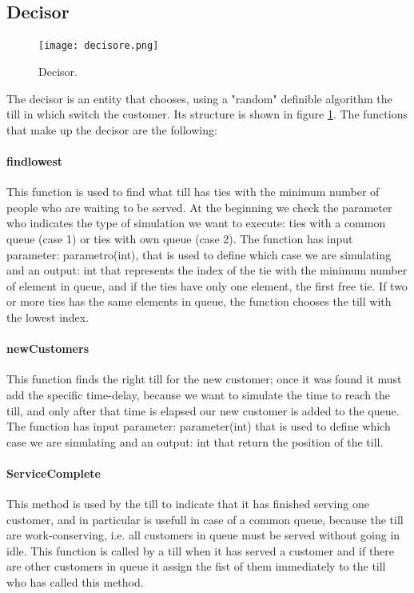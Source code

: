 \subsection{Decisor}
\paragraph{}
\begin{figure}[h]
  \begin{center}
  \texttt{[image: decisore.png]}
  \caption{Decisor.}
  \label{fig:dec}
  \end{center}
\end{figure}
The decisor is an entity that chooses, using a "random" definible algorithm the till in which switch the customer. Its structure is shown in figure \ref{fig:dec}.
The functions that make up the decisor are the following: 
\paragraph{findlowest}
This function is used to find what till has ties with the minimum number of people who are waiting to be served. At the beginning we check the parameter who indicates the type of simulation we want to execute: ties with a common queue (case 1) or ties with own queue (case 2). The function has input parameter: parametro(int), that is used to define which case we are simulating and an output: int that represents the index of the tie with the minimum number of element in queue, and if the ties have only one element, the first free tie. If two or more ties has the same elements in queue, the function chooses the till with the lowest index.
\paragraph{newCustomers}
This function finds the right till for the new customer; once it was found it must add the specific time-delay, because we want to simulate the time to reach the till, and only after that time is elapsed our new customer is added to the queue.
The function has input parameter: parameter(int) that is used to define which case we are simulating and an output: int that return the position of the till.
\paragraph{ServiceComplete}
This method is used by the till to indicate that it has finished serving one customer, and in particular is usefull in case of a common queue, because the till are work-conserving, i.e. all customers in queue must be served without going in idle. This function is called by a till when it has served a customer and if there are other customers in queue it assign the fist of them immediately to the till who has called this method.
